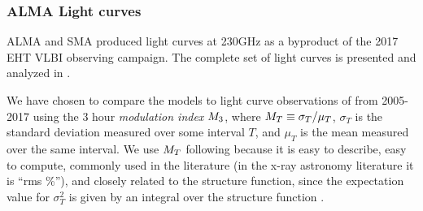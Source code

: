 
\subsubsection{ALMA Light curves}


ALMA and SMA produced \sgra light curves at 230GHz as a byproduct of the 2017 EHT VLBI observing campaign. The complete set of light curves is presented and analyzed in \cite{Wielgus2022}.

We have chosen to compare the models to light curve observations of \sgra from 2005-2017 using the 3 hour {\em modulation index} $M_{3}$, where $M_{T} \equiv \sigma_T/\mu_T$, $\sigma_T$ is the standard deviation measured over some interval $T$, and $\mu_T$ is the mean measured over the same interval.  We use $M_{T}$ following \citet{2015ApJ...812..103C} because it is easy to describe, easy to compute, commonly used in the literature (in the x-ray astronomy literature it is ``rms \%''), and closely related to the structure function, since the expectation value for $\sigma_T^2$ is given by an integral over the structure function \citep[see][]{Lee_2022}.

